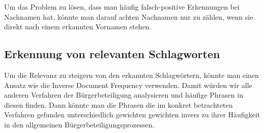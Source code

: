 \documentclass[runningheads]{llncs}
\begin{document}
Um das Problem zu lösen, dass man häufig falsch-positive Erkennungen bei Nachnamen hat, könnte man darauf achten Nachnamen nur zu zählen, wenn sie direkt nach einem erkannten Vornamen stehen.
\subsection{Erkennung von relevanten Schlagworten}
Um die Relevanz zu steigern von den erkannten Schlagwörtern, könnte man einen Ansatz wie die Inverse Document Frequency verwenden.
Damit würden wir alle anderen Verfahren der Bürgerbeteiligung analysieren und häufige Phrasen in diesen finden.
Dann könnte man die Phrasen die im konkret betrachteten Verfahren gefunden unterschiedlich gewichten gewichten invers zu ihrer Häufigkeit in den allgemeinen Bürgerbeteiligungsprozessen. %
\end{document}
